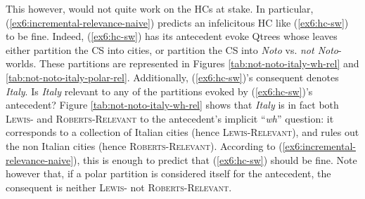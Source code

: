 \begin{exe}
	\label{ex6:incremental-relevance-naive}
\end{exe}

This however, would not quite work on the HCs at stake. In particular, (\ref{ex6:incremental-relevance-naive}) predicts an infelicitous HC like (\ref{ex6:hc-sw}) to be fine. Indeed, (\ref{ex6:hc-sw}) has its antecedent evoke Qtrees whose leaves either partition the CS into cities, or partition the CS into \textit{Noto} vs. \textit{not Noto}-worlds. These partitions are represented in Figures \ref{tab:not-noto-italy-wh-rel} and \ref{tab:not-noto-italy-polar-rel}. Additionally, (\ref{ex6:hc-sw})'s consequent denotes \textit{Italy}. Is \textit{Italy} relevant to any of the partitions evoked by (\ref{ex6:hc-sw})'s antecedent? Figure \ref{tab:not-noto-italy-wh-rel} shows that \textit{Italy} is in fact both \textsc{Lewis-} and \textsc{Roberts-Relevant} to the antecedent's implicit ``\textit{wh}'' question: it corresponds to a collection of Italian cities (hence \textsc{Lewis-Relevant}), and rules out the non Italian cities (hence \textsc{Roberts-Relevant}). According to (\ref{ex6:incremental-relevance-naive}), this is enough to predict that (\ref{ex6:hc-sw}) should be fine. Note however that, if a polar partition is considered itself for the antecedent, the consequent is neither \textsc{Lewis-} not \textsc{Roberts-Relevant}.

